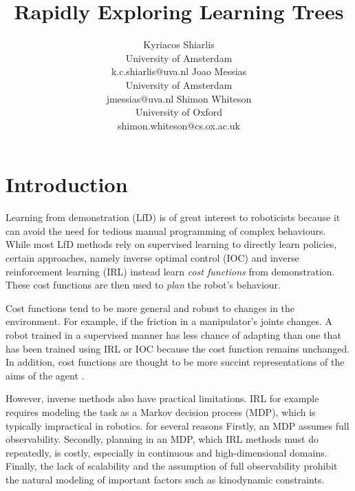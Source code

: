 \documentclass{article}  %
\title{\LARGE \bf
Rapidly Exploring Learning Trees
}
\author{Kyriacos Shiarlis \\
University of Amsterdam \\
k.c.shiarlis@uva.nl
\And 
Joao Messias \\
University of Amsterdam \\ 
jmessias@uva.nl 
\And
Shimon Whiteson \\
University of Oxford \\
shimon.whiteson@cs.ox.ac.uk 
}
\begin{document}
\maketitle
\thispagestyle{empty}
\pagestyle{empty}


\begin{abstract}


\end{abstract}


\section{Introduction}

Learning from demonstration (LfD) \cite{argall2009survey} is of great interest to roboticists because it can avoid the need for tedious manual programming of complex behaviours. While most LfD methods rely on supervised learning to directly learn policies, certain approaches, namely inverse optimal control (IOC) \cite{kalman1964linear} and inverse reinforcement learning (IRL) \cite{abbeel2004apprenticeship} instead learn \emph{cost functions} from demonstration. These cost functions are then used to \emph{plan} the robot's behaviour. 

Cost functions tend to be more general and robust to changes in the environment. For example, if the friction in a manipulator's joints changes. A robot trained in a supervised manner has less chance of adapting than one that has been trained using IRL or IOC because the cost function remains unchanged. In addition, cost functions are thought to be more succint representations of the aims of the agent \cite{abbeel2004apprenticeship}. %

However, inverse methods also have practical limitations. IRL for example requires modeling the task as a Markov decision process (MDP), which is typically impractical in robotics. for several reasons  Firstly, an MDP assumes full observability. Secondly, planning in an MDP, which IRL methods must do repeatedly, is costly, especially in continuous and high-dimensional domains. Finally, the lack of scalability and the assumption of full observability prohibit the natural modeling of important factors such as kinodynamic constraints. 
\end{document}
